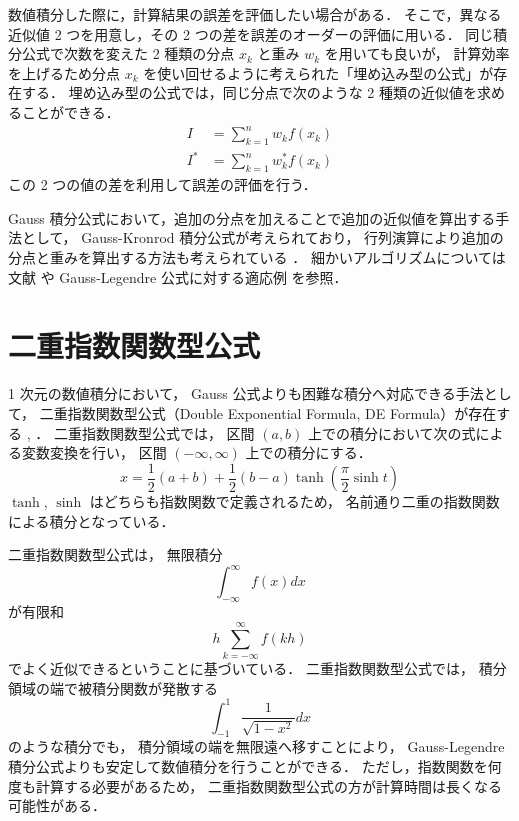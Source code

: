 数値積分した際に，計算結果の誤差を評価したい場合がある．
そこで，異なる近似値 2 つを用意し，その 2 つの差を誤差のオーダーの評価に用いる．
同じ積分公式で次数を変えた 2 種類の分点 $x_k$ と重み $w_k$ を用いても良いが，
計算効率を上げるため分点 $x_k$ を使い回せるように考えられた「埋め込み型の公式」が存在する．
埋め込み型の公式では，同じ分点で次のような 2 種類の近似値を求めることができる．
\begin{align}
    I   & = \sum_{k = 1}^n w_k f(x_k)   \\
    I^* & = \sum_{k = 1}^n w_k^* f(x_k)
\end{align}
この 2 つの値の差を利用して誤差の評価を行う．

Gauss 積分公式において，追加の分点を加えることで追加の近似値を算出する手法として，
Gauss-Kronrod 積分公式が考えられており，
行列演算により追加の分点と重みを算出する方法も考えられている
\cite{Laurie1997}．
細かいアルゴリズムについては文献 \cite{Laurie1997} や
Gauss-Legendre 公式に対する適応例 \cite{NumericalCollectionCpp} を参照．

\section{二重指数関数型公式}

1 次元の数値積分において，
Gauss 公式よりも困難な積分へ対応できる手法として，
二重指数関数型公式（Double Exponential Formula, DE Formula）が存在する
\cite[6.1 節 (b)]{Mori1993}, \cite[Section 4.5]{Press2007}．
二重指数関数型公式では，
区間 $(a, b)$ 上での積分において次の式による変数変換を行い，
区間 $(-\infty, \infty)$ 上での積分にする．
\begin{equation}
    x = \frac{1}{2}(a + b) + \frac{1}{2}(b - a) \tanh \left(\frac{\pi}{2} \sinh{t}\right)
\end{equation}
$\tanh$, $\sinh$ はどちらも指数関数で定義されるため，
名前通り二重の指数関数による積分となっている．

二重指数関数型公式は，
無限積分
\begin{equation}
    \int_{-\infty}^{\infty} f(x) dx
\end{equation}
が有限和
\begin{equation}
    h \sum_{k = -\infty}^{\infty} f(kh)
\end{equation}
でよく近似できるということに基づいている\cite[6.1 節 (b)]{Mori1993}．
二重指数関数型公式では，
積分領域の端で被積分関数が発散する
\begin{equation}
    \int_{-1}^{1} \frac{1}{\sqrt{1-x^2}} dx
\end{equation}
のような積分でも，
積分領域の端を無限遠へ移すことにより，
Gauss-Legendre 積分公式よりも安定して数値積分を行うことができる．
ただし，指数関数を何度も計算する必要があるため，
二重指数関数型公式の方が計算時間は長くなる可能性がある．

